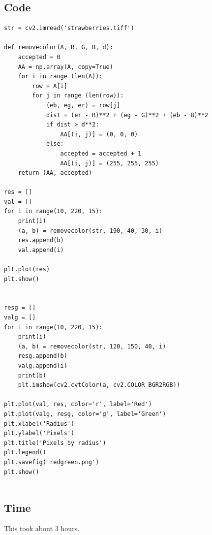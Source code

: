 \documentclass{article}
\begin{document}
\subsection{Code}
\begin{verbatim}
str = cv2.imread('strawberries.tiff')

def removecolor(A, R, G, B, d):
    accepted = 0
    AA = np.array(A, copy=True)
    for i in range (len(A)):
        row = A[i]
        for j in range (len(row)):
            (eb, eg, er) = row[j]
            dist = (er - R)**2 + (eg - G)**2 + (eb - B)**2
            if dist > d**2:
                AA[(i, j)] = (0, 0, 0)
            else:
                accepted = accepted + 1
                AA[(i, j)] = (255, 255, 255)
    return (AA, accepted)

res = []
val = []
for i in range(10, 220, 15):
    print(i)
    (a, b) = removecolor(str, 190, 40, 30, i)
    res.append(b)
    val.append(i)
    
plt.plot(res)
plt.show()


resg = []
valg = []
for i in range(10, 220, 15):
    print(i)
    (a, b) = removecolor(str, 120, 150, 40, i)
    resg.append(b)
    valg.append(i)
    print(b)
    plt.imshow(cv2.cvtColor(a, cv2.COLOR_BGR2RGB))
    
plt.plot(val, res, color='r', label='Red') 
plt.plot(valg, resg, color='g', label='Green') 
plt.xlabel('Radius')
plt.ylabel('Pixels') 
plt.title('Pixels by radius')
plt.legend() 
plt.savefig('redgreen.png')
plt.show()


\end{verbatim}
\subsection{Time}
This took about 3 hours.
\newpage
\end{document}
